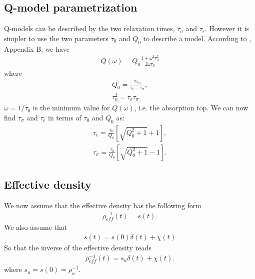\documentclass[11pt]{article}
\begin{document}
\subsection*{Q-model parametrization}
Q-models can be described by the two relaxation times, $\tau_{\sigma}$
and $\tau_{\epsilon}$. However it is simpler to use the two parameters
$\tau_0$ and $Q_0$ to describe a model.
According to \cite{Casula1992}, Appendix B, we have
\begin{eqnarray*}
  Q(\omega) = Q_0\frac{1+\omega^2\tau_0^2}{2\omega\tau_0}
\end{eqnarray*}
where
\begin{eqnarray*}
  Q_0 = \frac{2\tau_0}{\tau_{\epsilon} -\tau_{\sigma}}, \\
  \tau_0^2 = \tau_{\epsilon}\tau_{\sigma}.
\end{eqnarray*}
$\omega=1/\tau_0$ is the minimum value for $Q(\omega)$, i.e. the
absorption top.
We can now find $\tau_{\sigma}$ and $\tau_{\epsilon}$ in terms of
$\tau_0$ and $Q_0$ as:
\begin{eqnarray*}
  \tau_{\epsilon} = \frac{\tau_0}{Q_0}\left[\sqrt{Q^2_0+1} +1\right], \\
  \tau_{\sigma} = \frac{\tau_0}{Q_0}\left[\sqrt{Q^2_0+1} -1\right].
\end{eqnarray*}
\subsection*{Effective density} 
We now assume that the effective density has the following form
\begin{eqnarray}
 \rho^{-1}_{eff}(t) = s(t).
\end{eqnarray}
We also assume that 
\begin{eqnarray}
 s(t) = s(0)\delta(t)+\chi(t)
\end{eqnarray}
So that the inverse of the effective density reads
\begin{eqnarray}
 \rho^{-1}_{eff}(t) = s_u\delta(t)+\chi(t).
\end{eqnarray}
where $s_u = s(0)=\rho^{-1}_u$.
\end{document}
